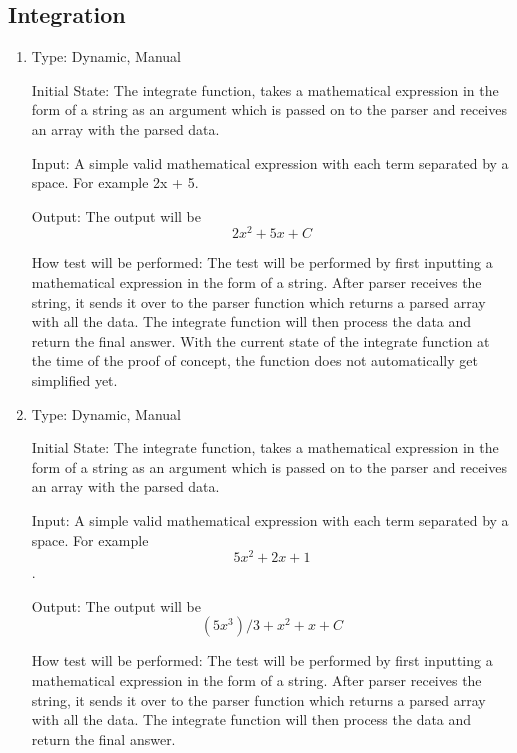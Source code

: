 \documentclass[12pt, titlepage]{article}
\begin{document}
\subsection{Integration}
\begin{enumerate}
\item{}
Type: Dynamic, Manual

Initial State: The integrate function, takes a mathematical expression in the form of a string as an argument which is passed on to the parser and receives an array with the parsed data.

Input: A simple valid mathematical expression with each term separated by a space. For example 2x + 5.

Output: The output will be \[2x^2 + 5x + C\]

How test will be performed: The test will be performed by first inputting a mathematical expression in the form of a string. After parser receives the string, it sends it over to the parser function which returns a parsed array with all the data. The integrate function will then process the data and return the final answer. With the current state of the integrate function at the time of the proof of concept, the function does not automatically get simplified yet.

\item{}
Type: Dynamic, Manual

Initial State: The integrate function, takes a mathematical expression in the form of a string as an argument which is passed on to the parser and receives an array with the parsed data.

Input: A simple valid mathematical expression with each term separated by a space. For example \[5x^2 + 2x + 1\].

Output: The output will be \[(5x^3)/3 + x^2 + x + C\]

How test will be performed: The test will be performed by first inputting a mathematical expression in the form of a string. After parser receives the string, it sends it over to the parser function which returns a parsed array with all the data. The integrate function will then process the data and return the final answer. 


\end{enumerate}
\end{document}

